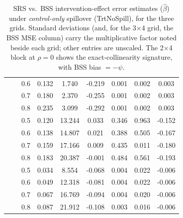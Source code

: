 \documentclass{article}[11pt]
\begin{document}
\begin{table}[ht!]
{\begin{tabular}{l c c ccc ccc}
    & & 0.6 & 0.132 & 1.740 & -0.219 & 0.001 & 0.002 & 0.003 \\
    & & 0.7 & 0.180 & 2.370 & -0.255 & 0.001 & 0.002 & 0.003 \\
    & & 0.8 & 0.235 & 3.099 & -0.292 & 0.001 & 0.002 & 0.003 \\
    \midrule
     &  & 0.5 & 0.120 & 13.244 & 0.033 & 0.346 & 0.963 & -0.152 \\
    & & 0.6 & 0.138 & 14.807 & 0.021 & 0.388 & 0.505 & -0.167 \\
    & & 0.7 & 0.159 & 17.166 & 0.009 & 0.435 & 0.011 & -0.180 \\
    & & 0.8 & 0.183 & 20.387 & -0.001 & 0.484 & 0.561 & -0.193 \\
    \cmidrule(lr){2-9}
    &  & 0.5 & 0.034 & 8.554 & -0.068 & 0.004 & 0.022 & -0.006 \\
    & & 0.6 & 0.049 & 12.318 & -0.081 & 0.004 & 0.022 & -0.006 \\
    & & 0.7 & 0.067 & 16.769 & -0.094 & 0.004 & 0.020 & -0.006 \\
    & & 0.8 & 0.087 & 21.912 & -0.108 & 0.003 & 0.016 & -0.006 \\
    \bottomrule
\end{tabular}}
\caption{SRS vs.\ BSS intervention-effect error estimates ($\hat{\beta}$) under \emph{control-only} spillover (TrtNoSpill), for the three grids. Standard deviations (and, for the 3$\times$4 grid, the BSS MSE column) carry the multiplicative factor noted beside each grid; other entries are unscaled. The 2$\times$4 block at $\rho=0$ shows the exact-collinearity signature, with BSS bias $=-\psi$.}
\label{table:InterventionEstimatesNoSpill}
\end{table}
\end{document}
